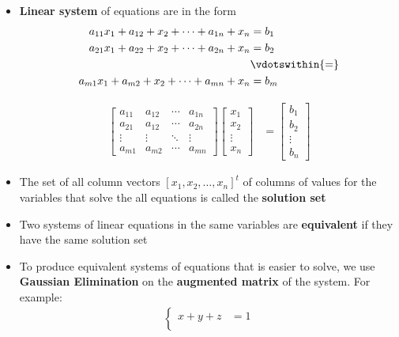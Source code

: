 \begin{itemize}
  \item
    \textbf{Linear system} of equations are in the form
    \begin{align*}
      a_{1 1} x_1 + a_{1 2} + x_2 + \cdots + a_{1 n} + x_n &= b_1 \\
      a_{2 1} x_1 + a_{2 2} + x_2 + \cdots + a_{2 n} + x_n &= b_2 \\
                                                           &\vdotswithin{=} \notag \\
      a_{m 1} x_1 + a_{m 2} + x_2 + \cdots + a_{m n} + x_n &= b_m
    \end{align*}

    \begin{align*}
      \begin{bmatrix}
        a_{1 1} & a_{1 2} & \cdots & a_{1 n} \\
        a_{2 1} & a_{1 2} & \cdots & a_{2 n} \\
        \vdots  & \vdots  & \ddots & \vdots \\
        a_{m 1} & a_{m 2} & \cdots & a_{m n}
      \end{bmatrix}
      \begin{bmatrix}
        x_1 \\
        x_2 \\
        \vdots \\
        x_n
      \end{bmatrix}
    &=
    \begin{bmatrix}
      b_1 \\
      b_2 \\
      \vdots \\
      b_n
    \end{bmatrix}
    \end{align*}
  \item The set of all column vectors $[ x_1, x_2, \ldots, x_n ]^t$ of columns of values for the variables that solve the all equations is called the \textbf{solution set}
  \item Two systems of linear equations in the same variables are \textbf{equivalent} if they have the same solution set
  \item To produce equivalent systems of equations that is easier to solve, we use \textbf{Gaussian Elimination} on the \textbf{augmented matrix} of the system.
    For example:
    \begin{align*}
      \begin{cases}
        x + y + z &= 1 \\

\end{cases}
\end{align*}
\end{itemize}
